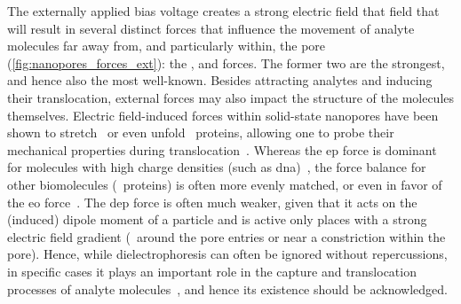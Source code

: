 The externally applied bias voltage creates a strong electric field that field that will result in several
distinct forces that influence the movement of analyte molecules far away from, and particularly within, the
pore (\cref{fig:nanopores_forces_ext}): the ,
 and  forces. The former two are the
strongest, and hence also the most well-known. Besides attracting analytes and inducing their translocation,
external forces may also impact the structure of the molecules themselves. Electric field-induced forces
within solid-state nanopores have been shown to stretch~\cite{Freedman-2013} or even
unfold~\cite{Freedman-2011} proteins, allowing one to probe their mechanical properties during
translocation~\cite{Waduge-2017,Zhou-2020b}. Whereas the \gls{ep} force is dominant for molecules with high
charge densities (such as \gls{dna})~\cite{vanDorp-2009}, the force balance for other biomolecules
(\eg~proteins) is often more evenly matched, or even in favor of the \gls{eo}
force~\cite{Soskine-2013,Zhang-2020}. The \gls{dep} force is often much weaker, given that it acts on the
(induced) dipole moment of a particle and is active only places with a strong electric field gradient
(\ie~around the pore entries or near a constriction within the pore). Hence, while dielectrophoresis can often
be ignored without repercussions, in specific cases it plays an important role in the capture and
translocation processes of analyte molecules~\cite{Freedman-2016,Asandei-2016}, and hence its existence should
be acknowledged.

